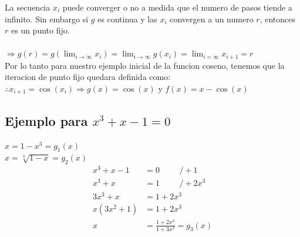 \newpage
La secuencia $x_i$ puede converger o no a medida que el numero de pasos tiende a infinito. Sin embargo si $g$ es continua y las $x_i$ convergen a un numero $r$, entonces $r$ es un punto fijo.\\
\vspace{0.5cm}
\\
\vspace{0.2cm}
$\Rightarrow g(r) = g(\displaystyle\lim_{i \to \infty} x_i) = \lim_{i \to \infty} g(x_i) = \lim_{i = \infty} x_{i+1} = r$\\
\vspace{0.2cm}
Por lo tanto para nuestro ejemplo inicial de la funcion coseno, tenemos que la iteracion de punto fijo quedara definida como:\\
\vspace{0.2cm}
$\therefore x_{i+1} = \cos{(x_i)} \Rightarrow g(x) = \cos{(x)}$ y $f(x) = x-\cos{(x)} $\\

\centering
\subsection*{Ejemplo para \(x^3 + x - 1 = 0\)}
\vspace{1.5cm}
\begin{enumerate}
\Myitem
\hspace{6cm}\(x = 1 - x^3 = g_1(x)\) \\
\vspace{0.5cm}
\Myitem
\hspace{6cm}\(x = \sqrt[3]{1-x} = g_2(x)\)\\
\Myitem
\begin{equation*}
\begin{aligned}
x^3 + x - 1 &= 0 \hspace{1cm}/ +1 \\
x^3 + x &= 1 \hspace{1cm}/ +2x^3 \\
3x^3 + x &= 1 + 2x^3 \\
x(3x^2 + 1) &= 1 + 2x^3 \\
x &= \frac{1 + 2x^3}{1 + 3x^2} = g_3(x)
\end{aligned}
\end{equation*}
\end{enumerate}
\newpage
\raggedright
